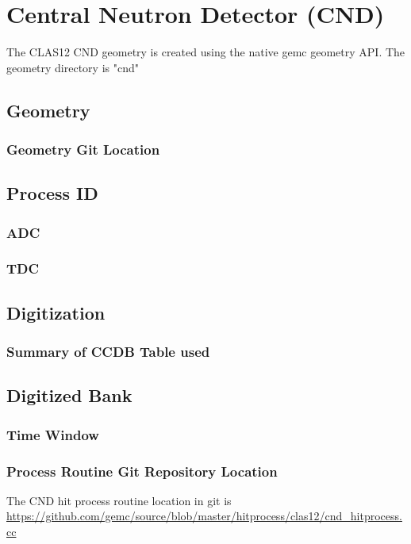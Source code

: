 \section{Central Neutron Detector (CND)}


The CLAS12 CND geometry is created using the native gemc geometry API.
The geometry directory is "cnd"

\subsection{Geometry}

\subsubsection{Geometry Git Location}

\subsection{Process ID}
\subsubsection{ADC}
\subsubsection{TDC}

\subsection{Digitization}


\subsubsection{Summary of CCDB Table used}

\subsection{Digitized Bank}

\subsubsection{Time Window}

\subsubsection{Process Routine Git Repository Location}


The CND hit process routine location in git is \url{https://github.com/gemc/source/blob/master/hitprocess/clas12/cnd_hitprocess.cc}
